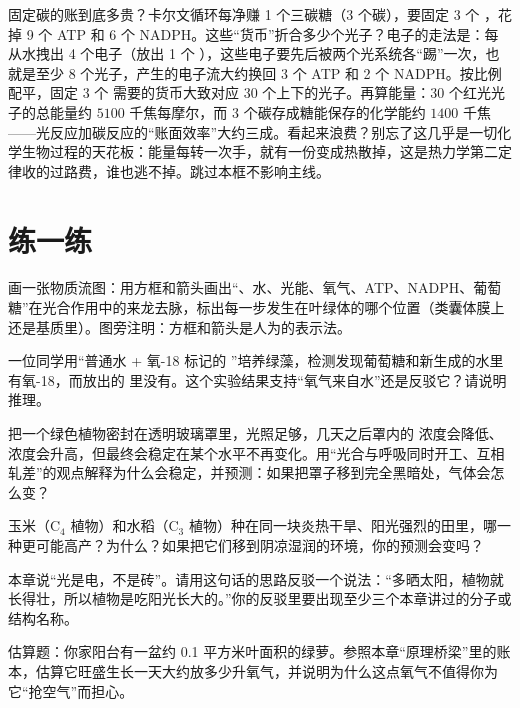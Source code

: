 \begin{tiaozhan}
固定碳的账到底多贵？卡尔文循环每净赚 1 个三碳糖（3 个碳），要固定 3 个 ，花掉 9 个 ATP 和 6 个 NADPH。这些“货币”折合多少个光子？电子的走法是：每从水拽出 4 个电子（放出 1 个 ），这些电子要先后被两个光系统各“踢”一次，也就是至少 $8$ 个光子，产生的电子流大约换回 3 个 ATP 和 2 个 NADPH。按比例配平，固定 3 个  需要的货币大致对应 $30$ 个上下的光子。再算能量：30 个红光光子的总能量约 $5100$ 千焦每摩尔，而 3 个碳存成糖能保存的化学能约 $1400$ 千焦——光反应加碳反应的“账面效率”大约三成。看起来浪费？别忘了这几乎是一切化学生物过程的天花板：能量每转一次手，就有一份变成热散掉，这是热力学第二定律收的过路费，谁也逃不掉。跳过本框不影响主线。
\end{tiaozhan}

\section*{练一练}

\begin{sikaoti}
\item 画一张物质流图：用方框和箭头画出“、水、光能、氧气、ATP、NADPH、葡萄糖”在光合作用中的来龙去脉，标出每一步发生在叶绿体的哪个位置（类囊体膜上还是基质里）。图旁注明：方框和箭头是人为的表示法。
\item 一位同学用“普通水 + 氧-18 标记的 ”培养绿藻，检测发现葡萄糖和新生成的水里有氧-18，而放出的  里没有。这个实验结果支持“氧气来自水”还是反驳它？请说明推理。
\item 把一个绿色植物密封在透明玻璃罩里，光照足够，几天之后罩内的  浓度会降低、 浓度会升高，但最终会稳定在某个水平不再变化。用“光合与呼吸同时开工、互相轧差”的观点解释为什么会稳定，并预测：如果把罩子移到完全黑暗处，气体会怎么变？
\item 玉米（C$_4$ 植物）和水稻（C$_3$ 植物）种在同一块炎热干旱、阳光强烈的田里，哪一种更可能高产？为什么？如果把它们移到阴凉湿润的环境，你的预测会变吗？
\item 本章说“光是电，不是砖”。请用这句话的思路反驳一个说法：“多晒太阳，植物就长得壮，所以植物是吃阳光长大的。”你的反驳里要出现至少三个本章讲过的分子或结构名称。
\item 估算题：你家阳台有一盆约 0.1 平方米叶面积的绿萝。参照本章“原理桥梁”里的账本，估算它旺盛生长一天大约放多少升氧气，并说明为什么这点氧气不值得你为它“抢空气”而担心。
\end{sikaoti}

